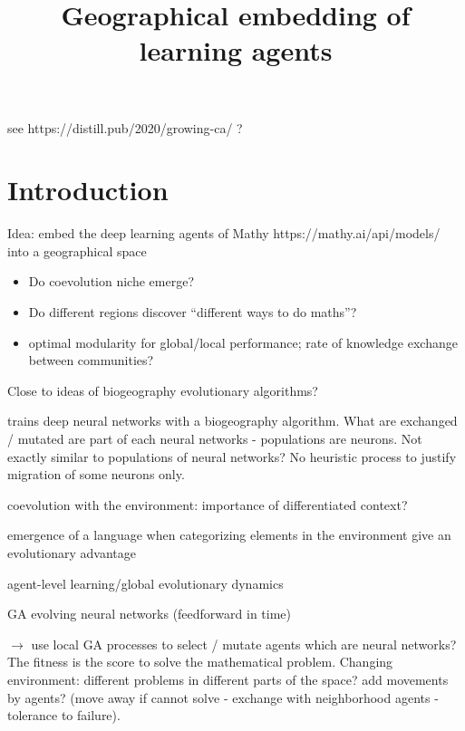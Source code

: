 \documentclass{article}
\title{Geographical embedding of learning agents}
\author{}
\date{}
\begin{document}
\maketitle

see https://distill.pub/2020/growing-ca/ ?

\section{Introduction}

Idea: embed the deep learning agents of Mathy https://mathy.ai/api/models/ into a geographical space 

\begin{itemize}
    \item Do coevolution niche emerge?
    \item Do different regions discover ``different ways to do maths''?
    \item optimal modularity for global/local performance; rate of knowledge exchange between communities?
\end{itemize}


\cite{Kostere2106028118}

Close to ideas of biogeography evolutionary algorithms?

\cite{mirjalili2014let} trains deep neural networks with a biogeography algorithm. What are exchanged / mutated are part of each neural networks - populations are neurons. Not exactly similar to populations of neural networks? No heuristic process to justify migration of some neurons only.


\cite{bruce2001evolving}

\cite{lund1995preadaptation} coevolution with the environment: importance of differentiated context?

\cite{cangelosi1998emergence} emergence of a language when categorizing elements in the environment give an evolutionary advantage

\cite{nolfi1994learning} agent-level learning/global evolutionary dynamics

\cite{beer1992evolving} GA evolving neural networks (feedforward in time)

\cite{stanley2002evolving}

$\rightarrow$ use local GA processes to select / mutate agents which are neural networks? The fitness is the score to solve the mathematical problem. Changing environment: different problems in different parts of the space? add movements by agents? (move away if cannot solve - exchange with neighborhood agents - tolerance to failure).

\cite{denaro1997cultural}
\end{document}
